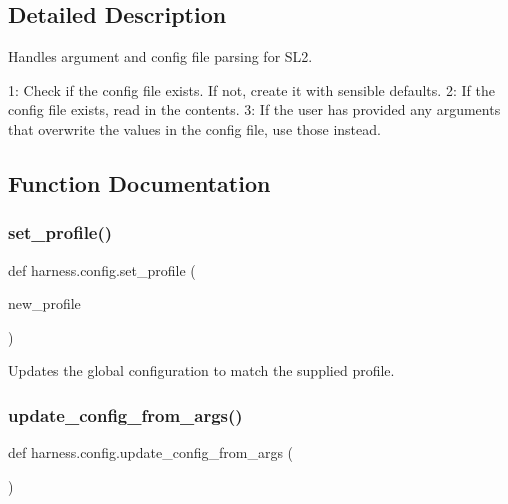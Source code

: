 \subsection{Detailed Description}
\begin{DoxyVerb}Handles argument and config file parsing for SL2.

1: Check if the config file exists. If not, create it with sensible defaults.
2: If the config file exists, read in the contents.
3: If the user has provided any arguments that overwrite the values in the
config file, use those instead.
\end{DoxyVerb}
 

\subsection{Function Documentation}
\mbox{\label{namespaceharness_1_1config_a76d6ca110a588f9fc5a9148f7cad031a}} 
\subsubsection{\texorpdfstring{set\+\_\+profile()}{set\_profile()}}
{\footnotesize\ttfamily def harness.\+config.\+set\+\_\+profile (\begin{DoxyParamCaption}\item[{}]{new\+\_\+profile }\end{DoxyParamCaption})}

\begin{DoxyVerb}Updates the global configuration to match the supplied profile.
\end{DoxyVerb}
 \mbox{\label{namespaceharness_1_1config_af973468652776588816fd0796be0f49b}} 
\subsubsection{\texorpdfstring{update\+\_\+config\+\_\+from\+\_\+args()}{update\_config\_from\_args()}}
{\footnotesize\ttfamily def harness.\+config.\+update\+\_\+config\+\_\+from\+\_\+args (\begin{DoxyParamCaption}{ }\end{DoxyParamCaption})}

